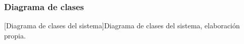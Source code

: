 \subsubsection{Diagrama de clases}
\begin{center}
	[Diagrama de clases del sistema]{Diagrama de clases del sistema, elaboración propia.}
\end{center}

